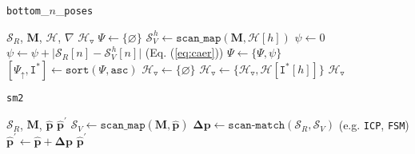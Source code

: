 \begin{algorithm}
  \caption{\texttt{bottom}\_$n$\_\texttt{poses}}
  \begin{spacing}{1.2}
  \begin{algorithmic}[1]
    \REQUIRE $\mathcal{S}_R$, $\bm{M}$, $\mathcal{H}$, $\nabla$
    \ENSURE $\mathcal{H}_{\triangledown}$
    \STATE $\Psi \leftarrow \{\varnothing \}$
      \STATE $\mathcal{S}_V^{\hspace{1pt} h} \leftarrow \texttt{scan\_map}(\bm{M}, \mathcal{H}[h])$
      \STATE $\psi \leftarrow 0$
        \STATE $\psi \leftarrow \psi + \big|\mathcal{S}_R[n]-\mathcal{S}_V^{\hspace{1pt} h}[n]\big|$ \hfill \small (Eq. (\ref{eq:caer}))
      \ENDFOR
      \STATE $\Psi \leftarrow \{\Psi, \psi\}$
    \ENDFOR
    \STATE $[\Psi_{\uparrow}, \texttt{I}^{\ast}] \leftarrow \texttt{sort}(\Psi, \texttt{asc})$
    \STATE $\mathcal{H}_{\triangledown} \leftarrow \{\varnothing \}$
      \STATE $\mathcal{H}_{\triangledown} \leftarrow \{\mathcal{H}_{\triangledown}, \mathcal{H}[\texttt{I}^{\ast}[h]]\}$
    \ENDFOR
    \RETURN $\mathcal{H}_{\triangledown}$
  \end{algorithmic}
  \end{spacing}
  \label{alg:algorithm_bottom_n}
\end{algorithm}


\begin{algorithm}
  \caption{\texttt{sm2}}
  \begin{spacing}{1.2}
  \begin{algorithmic}[1]
    \REQUIRE $\mathcal{S}_R$, $\bm{M}$, $\hat{\bm{p}}$
    \ENSURE $\hat{\bm{p}}^\prime$
    \STATE $\mathcal{S}_V \leftarrow \texttt{scan\_map}(\bm{M}, \hat{\bm{p}})$
    \STATE $\bm{\Delta p} \leftarrow \texttt{scan-match}(\mathcal{S}_R,\mathcal{S}_V)$ \hfill \small (e.g. \texttt{ICP}\cite{kissicp}, \texttt{FSM}\cite{fsm})
    \STATE $\hat{\bm{p}}^\prime \leftarrow \hat{\bm{p}} + \bm{\Delta p}$
    \RETURN $\hat{\bm{p}}^\prime$
  \end{algorithmic}
  \end{spacing}
  \label{alg:algorithm_sm2}
\end{algorithm}

